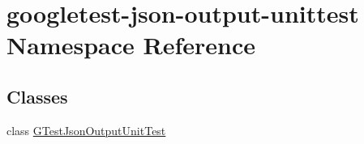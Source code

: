\hypertarget{namespacegoogletest-json-output-unittest}{}\section{googletest-\/json-\/output-\/unittest Namespace Reference}
\label{namespacegoogletest-json-output-unittest}
\subsection*{Classes}
\begin{DoxyCompactItemize}
\item 
class \mbox{\hyperlink{classgoogletest-json-output-unittest_1_1_g_test_json_output_unit_test}{G\+Test\+Json\+Output\+Unit\+Test}}
\end{DoxyCompactItemize}
